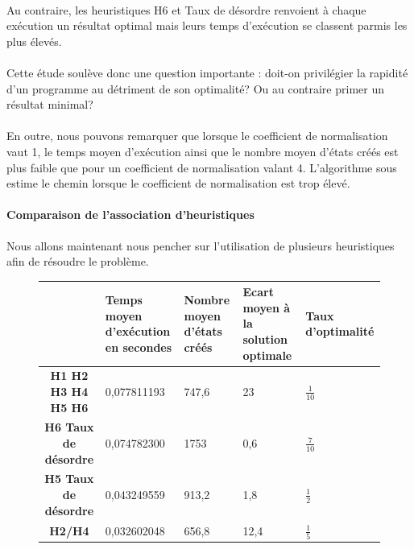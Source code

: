 \documentclass[10pt,a4paper]{report}
\begin{document}
\paragraph{}{Au contraire, les heuristiques H6 et Taux de désordre renvoient à chaque exécution un résultat optimal mais leurs temps d'exécution se classent parmis les plus élevés.}

\paragraph{}{Cette étude soulève donc une question importante : doit-on privilégier la rapidité d'un programme au détriment de son optimalité? Ou au contraire primer un résultat minimal?}

\paragraph{}{En outre, nous pouvons remarquer que lorsque le coefficient de normalisation
vaut 1, le temps moyen d'exécution ainsi que le nombre moyen d'états créés est plus faible 
que pour un coefficient de normalisation valant 4. L'algorithme sous estime le chemin lorsque le coefficient de normalisation est trop élevé.}
\paragraph{Comparaison de l'association d'heuristiques}{Nous allons maintenant nous pencher sur l'utilisation de plusieurs heuristiques afin de résoudre le problème.}

{\scriptsize{}
\renewcommand{\arraystretch}{1.3}
\vspace*{1cm}
\begin{figure}[h!]
\centering
\begin{tabular}
{| c || p{} | p{3cm} | p{3cm} | p{3cm} |} \hline \textbf{ } & \textbf{Temps moyen d'exécution en secondes }&
 \textbf{Nombre moyen d'états créés} & \textbf{Ecart moyen à la solution optimale} &
\textbf{Taux d'optimalité} \\ \hline \hline
\textbf{H1 H2 H3 H4 H5 H6} & 0,077811193 & 747,6 & 23 & $\frac{1}{10}$ \\ \hline
\textbf{H6 Taux de désordre} & 0,074782300 & 1753 & 0,6 & $\frac{7}{10}$   \\ \hline
\textbf{H5 Taux de désordre}& 0,043249559 & 913,2 & 1,8 & $\frac{1}{2}$ \\ \hline
\textbf{H2/H4}&0,032602048&656,8&12,4&$\frac{1}{5}$\\ \hline

\end{tabular}

\end{figure} \vspace*{0,5cm}}
\end{document}
